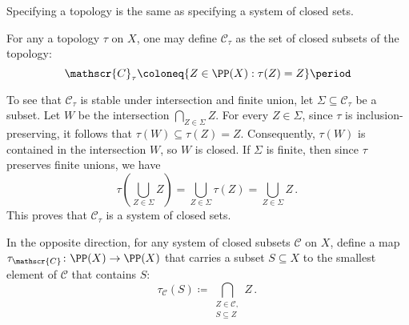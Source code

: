 \begin{nul}
	Specifying a topology is the same as specifying a system of closed sets.

	For any a topology $\tau$ on $X$, one may define $\mathscr{C}_{\tau}$ as the set of closed subsets of the topology:
	\[
		\mathscr{C}_{\tau} \coloneq \{ Z\in\PP(X) : \tau(Z)=Z \} \period
	\]

	To see that $\mathscr{C}_{\tau}$ is stable under intersection and finite union, let $\Sigma \subseteq \mathscr{C}_{\tau} $ be a subset.
	Let $W$ be the intersection $\bigcap_{Z \in \Sigma} Z$.
	For every $Z \in \Sigma$, since $\tau$ is inclusion-preserving, it follows that $\tau\left(W\right) \subseteq \tau(Z) = Z$.
	Consequently, $\tau(W) $ is contained in the intersection $W$, so $W$ is closed.
	If $\Sigma$ is finite, then since $\tau$ preserves finite unions, we have
	\[
		\tau\left(\bigcup_{Z\in\Sigma} Z\right) = \bigcup_{Z\in\Sigma} \tau(Z) = \bigcup_{Z \in \Sigma} Z \period
	\]
	This proves that $\mathscr{C}_{\tau}$ is a system of closed sets.

In the opposite direction, for any system of closed subsets $\mathscr{C}$ on $X$, define a map $\tau_{\mathscr{C}}\colon\PP(X) \to \PP(X)$ that carries a subset $S\subseteq X$ to the smallest element of $\mathscr{C}$ that contains $S$:
	\[
		\tau_{\mathscr{C}}(S) \coloneq \bigcap_{\substack{Z\in \mathscr{C},\\ S\subseteq Z}} Z \period
	\]
	

\end{nul}
